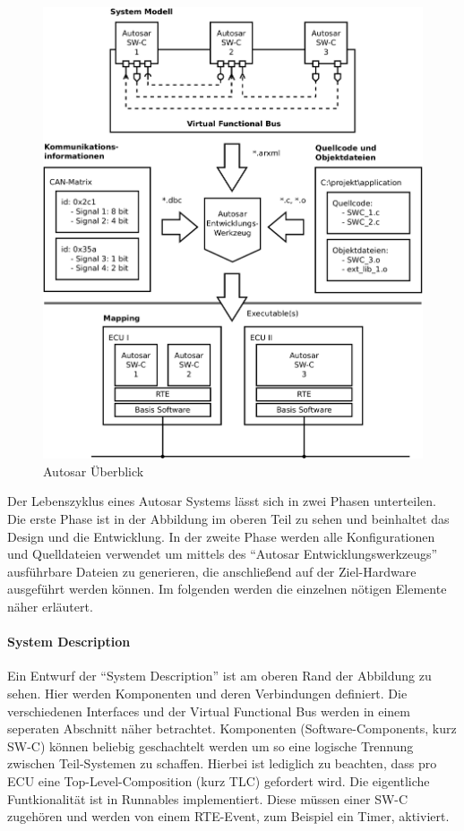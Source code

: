 \documentclass[
  a4paper,					    %
  twoside,
  DIV=calc,     				%
  bibliography=totoc,
  cleardoublepage=empty,
  ngerman,     					%
  final       					%
]{scrbook}
\begin{document}
\begin{figure}[!htbp]
    \centering
    \includegraphics[width=1\textwidth]{autosar_overview.png}
    \caption{Autosar Überblick}
    \label{fig:autosar_overview}
\end{figure}

Der Lebenszyklus eines Autosar Systems lässt sich in zwei Phasen unterteilen. Die erste Phase ist in der Abbildung im oberen Teil zu sehen und beinhaltet das Design und die Entwicklung. In der zweite Phase werden alle Konfigurationen und Quelldateien verwendet um mittels des "`Autosar Entwicklungswerkzeugs"'  ausführbare Dateien zu generieren, die anschließend auf der Ziel-Hardware ausgeführt werden können. Im folgenden werden die einzelnen nötigen Elemente näher erläutert.


\paragraph{System Description} Ein Entwurf der "`System Description"' ist am oberen Rand der Abbildung zu sehen. Hier werden Komponenten und deren Verbindungen definiert. Die verschiedenen Interfaces und der Virtual Functional Bus werden in einem seperaten Abschnitt näher betrachtet. Komponenten (Software-Components, kurz SW-C) können beliebig geschachtelt werden um so eine logische Trennung zwischen Teil-Systemen zu schaffen. Hierbei ist lediglich zu beachten, dass pro ECU eine Top-Level-Composition (kurz TLC) gefordert wird. Die eigentliche Funtkionalität ist in Runnables implementiert. Diese müssen einer SW-C zugehören und werden von einem RTE-Event, zum Beispiel ein Timer, aktiviert.
\end{document}
